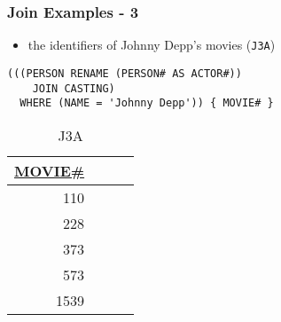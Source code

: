 \documentclass[dvipsnames]{beamer}
\theoremstyle{plain}
\begin{document}
\begin{frame}[fragile]
  \frametitle{Join Examples - 3}

  \begin{example}
    \begin{itemize}
      \item the identifiers of Johnny Depp's movies (\texttt{J3A})
    \end{itemize}

    \begin{lstlisting}
(((PERSON RENAME (PERSON# AS ACTOR#))
    JOIN CASTING)
  WHERE (NAME = 'Johnny Depp')) { MOVIE# }
  \end{lstlisting}

    \pause
    \vspace{-10pt}
    \begin{tiny}
    \begin{table}
      \caption{J3A}
      \begin{tabular}{|r|l|r|r|}\hline
\underline{MOVIE\#}\\[2pt]\hline\hline
                110\\\hline
                228\\\hline
                373\\\hline
                573\\\hline
               1539\\\hline
      \end{tabular}
    \end{table}
    \end{tiny}
  \end{example}
\end{frame}
\end{document}
